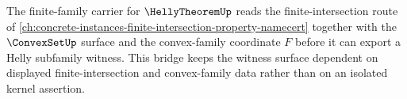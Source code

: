 The finite-family carrier for $\HellyTheoremUp$ reads the finite-intersection route of \autoref{ch:concrete-instances-finite-intersection-property-namecert} together with the $\ConvexSetUp$ surface and the convex-family coordinate $F$ before it can export a Helly subfamily witness. This bridge keeps the witness surface dependent on displayed finite-intersection and convex-family data rather than on an isolated kernel assertion.
